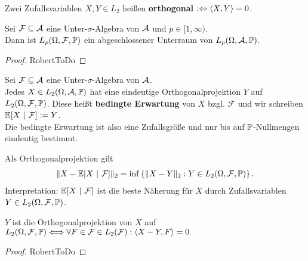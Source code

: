 \begin{bemerkung}
Zwei Zufallsvariablen $X,Y\in L_2$ heißen \textbf{orthogonal} $:\gdw\langle X,Y\rangle=0$.
\end{bemerkung}

\begin{proposition}
Sei $\mathcal{F}\subseteq\A$ eine Unter-$\sigma$-Algebra von $\A$ und $p\in[1,\infty)$.\\
Dann ist $L_p(\Omega,\mathcal{F},\P)$ ein abgeschlossener Unterraum von $L_p(\Omega,\A,\P)$.

\end{proposition}

\begin{proof}
RobertToDo
\end{proof}

\begin{defi}\enter
Sei $\mathcal{F}\subseteq\A$ eine Unter-$\sigma$-Algebra von $\A$.\\
Jedes $X\in L_2(\Omega,\mathcal{A},\P)$ hat eine eindeutige Orthogonalprojektion $Y$ auf $L_2(\Omega,\mathcal{F},\P)$. Diese heißt \textbf{bedingte Erwartung} von $X$ bzgl. $\mathcal{F}$ und wir schreiben $\E[X~|~\mathcal{F}]:=Y$.\\
Die bedingte Erwartung ist also eine Zufallsgröße und nur bis auf $\P$-Nullmengen eindeutig bestimmt.
\end{defi}

\begin{bemerkung}
Als Orthogonalprojektion gilt
\begin{align*}
\Vert X-\E[X~|~\mathcal{F}]\Vert_2=\inf\left\lbrace\Vert X-Y\Vert_2:Y\in L_2(\Omega,\mathcal{F},\P)\right\rbrace.
\end{align*}
Interpretation: $\E[X~|~\mathcal{F}]$ ist die beste Näherung für $X$ durch Zufallsvariablen $Y\in L_2(\Omega,\mathcal{F},\P)$.
\end{bemerkung}

\begin{proposition}\label{Prop1.3}
$Y$ ist die Orthogonalprojektion von $X$ auf $L_2(\Omega,\mathcal{F},\P)\\\Longleftrightarrow\forall F\in\mathcal{F}\in L_2(\mathcal{F}):\langle X-Y,F\rangle=0$
\end{proposition}
\begin{proof}
RobertToDo
\end{proof}

